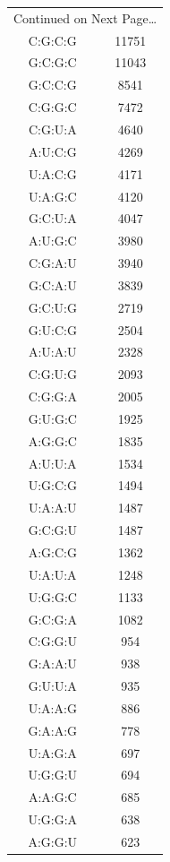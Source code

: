 \begin{center}
\begin{longtable}{c|c}
\multicolumn{2}{r}{Continued on Next Page\ldots} \\
\endfoot
\endlastfoot
C:G:C:G & 11751 \\ \hline
G:C:G:C & 11043 \\ \hline
G:C:C:G & 8541 \\ \hline
C:G:G:C & 7472 \\ \hline
C:G:U:A & 4640 \\ \hline
A:U:C:G & 4269 \\ \hline
U:A:C:G & 4171 \\ \hline
U:A:G:C & 4120 \\ \hline
G:C:U:A & 4047 \\ \hline
A:U:G:C & 3980 \\ \hline
C:G:A:U & 3940 \\ \hline
G:C:A:U & 3839 \\ \hline
G:C:U:G & 2719 \\ \hline
G:U:C:G & 2504 \\ \hline
A:U:A:U & 2328 \\ \hline
C:G:U:G & 2093 \\ \hline
C:G:G:A & 2005 \\ \hline
G:U:G:C & 1925 \\ \hline
A:G:G:C & 1835 \\ \hline
A:U:U:A & 1534 \\ \hline
U:G:C:G & 1494 \\ \hline
U:A:A:U & 1487 \\ \hline
G:C:G:U & 1487 \\ \hline
A:G:C:G & 1362 \\ \hline
U:A:U:A & 1248 \\ \hline
U:G:G:C & 1133 \\ \hline
G:C:G:A & 1082 \\ \hline
C:G:G:U & 954 \\ \hline
G:A:A:U & 938 \\ \hline
G:U:U:A & 935 \\ \hline
U:A:A:G & 886 \\ \hline
G:A:A:G & 778 \\ \hline
U:A:G:A & 697 \\ \hline
U:G:G:U & 694 \\ \hline
A:A:G:C & 685 \\ \hline
U:G:G:A & 638 \\ \hline
A:G:G:U & 623 \\ \hline

\end{longtable}
\end{center}
